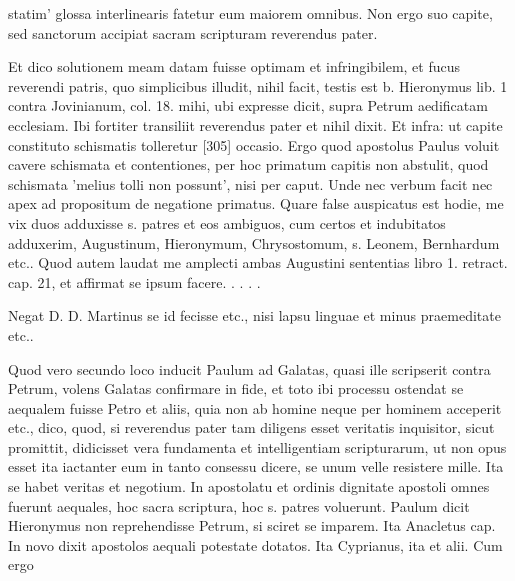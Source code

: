 statim' glossa interlinearis fatetur eum maiorem omnibus. Non ergo suo capite, sed sanctorum accipiat sacram scripturam reverendus pater.

Et dico solutionem meam datam fuisse optimam et infringibilem, et fucus reverendi patris, quo simplicibus illudit, nihil facit, testis est b. Hieronymus lib. 1 contra Jovinianum, col. 18. mihi, ubi expresse dicit, supra Petrum aedificatam ecclesiam. Ibi fortiter transiliit reverendus pater et nihil dixit. Et infra: ut capite constituto schismatis tolleretur [305] occasio. Ergo quod apostolus Paulus voluit cavere schismata et contentiones, per hoc primatum capitis non abstulit, quod schismata 'melius tolli non possunt', nisi per caput. Unde nec verbum facit nec apex ad propositum de negatione primatus. Quare false auspicatus est hodie, me vix duos adduxisse s. patres et eos ambiguos, cum certos et indubitatos adduxerim, Augustinum, Hieronymum, Chrysostomum, s. Leonem, Bernhardum etc.. Quod autem laudat me amplecti ambas Augustini sententias libro 1. retract. cap. 21, et affirmat se ipsum facere. . . . .

Negat D. D. Martinus se id fecisse etc., nisi lapsu linguae et minus praemeditate etc..

Quod vero secundo loco inducit Paulum ad Galatas, quasi ille scripserit contra Petrum, volens Galatas confirmare in fide, et toto ibi processu ostendat se aequalem fuisse Petro et aliis, quia non ab homine neque per hominem acceperit etc., dico, quod, si reverendus pater tam diligens esset veritatis inquisitor, sicut promittit, didicisset vera fundamenta et intelligentiam scripturarum, ut non opus esset ita iactanter eum in tanto consessu dicere, se unum velle resistere mille. Ita se habet veritas et negotium. In apostolatu et ordinis dignitate apostoli omnes fuerunt aequales, hoc sacra scriptura, hoc s. patres voluerunt. Paulum dicit Hieronymus non reprehendisse Petrum, si sciret se imparem. Ita Anacletus cap. In novo dixit apostolos aequali potestate dotatos. Ita Cyprianus, ita et alii. Cum ergo

